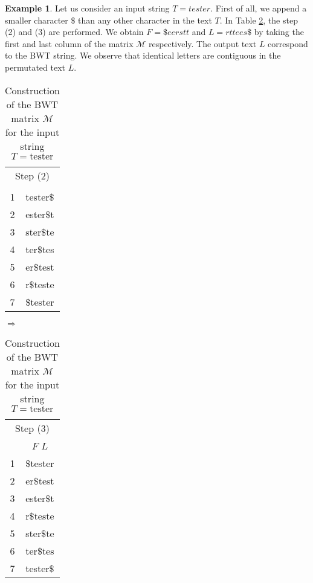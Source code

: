 \documentclass[11pt,twoside]{article}
\theoremstyle{definition}
\newtheorem{example}{Example}
\begin{document}
\begin{example}\label{ex:bw1}
Let us consider an input string $T = \textit{tester}$. First of all, we append a smaller character $\$$ than any other character in the text $T$. In Table \ref{tab:example_bw}, the step (2) and (3) are performed. We obtain $F = \$eerstt$ and $L = \textit{rttees\$}$ by taking the first and last column of the matrix $\mathcal{M}$ respectively. The output text $L$ correspond to the BWT string. We observe that identical letters are contiguous in the permutated text $L$.

\begin{table}[h]
\centering
\caption{Construction of the BWT matrix $\mathcal{M}$ for the input string $T = \text{tester}$}
\label{tab:example_bw}
\begin{tabular}{cc}
 \multicolumn{2}{c}{Step (2)} \\
 \\
 \hline
 1 & tester$\$$ \\
 2 & ester$\$$t \\
 3 & ster$\$$te \\
 4 & ter$\$$tes \\
 5 & er$\$$test \\
 6 & r$\$$teste \\
 7 & $\$$tester \\
\end{tabular}
\qquad
$\Longrightarrow$
\qquad
\begin{tabular}{cc}
 \multicolumn{2}{c}{Step (3)} \\
 & $F$ \hspace{0.45cm} $L$ \\
 \hline
 1 & $\$$tester \\
 2 & er$\$$test \\
 3 & ester$\$$t \\
 4 & r$\$$teste \\
 5 & ster$\$$te \\
 6 & ter$\$$tes \\
 7 & tester$\$$ \\
\end{tabular}
\end{table}
\end{example}
\end{document}
